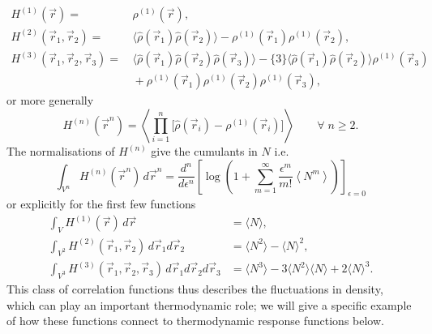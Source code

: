 \begin{subequations}\label{eq:density-density-correlations}
  \begin{align}
    H^{(1)}(\vec{r})
    =& \,
    \rho^{(1)}(\vec{r}),
    \\
    H^{(2)}(\vec{r}_1, \vec{r}_2)
    =& \,
    \big\langle \widehat\rho(\vec{r}_1) \widehat\rho(\vec{r}_2) \big\rangle
    - \rho^{(1)}(\vec{r}_1) \rho^{(1)}(\vec{r}_2),
    \label{eq:pair-density-density-correlation}
    \\
    H^{(3)}(\vec{r}_1, \vec{r}_2, \vec{r}_3)
    =& \,
    \big\langle \widehat\rho(\vec{r}_1) \widehat\rho(\vec{r}_2) \widehat\rho(\vec{r}_3) \big\rangle
    - \{3\} \big\langle \widehat\rho(\vec{r}_1) \widehat\rho(\vec{r}_2) \big\rangle \rho^{(1)}(\vec{r}_3)
    \nonumber \\ & \,
    + \rho^{(1)}(\vec{r}_1) \rho^{(1)}(\vec{r}_2) \rho^{(1)}(\vec{r}_3),
  \end{align}
\end{subequations}
or more generally \cite{Hansen2013}
\begin{equation}\label{eq:density-density-correlations}
  H^{(n)}(\vec{r}^n)
  =
  \left\langle
  \prod_{i=1}^n
  \Big[ \widehat\rho(\vec{r}_i) - \rho^{(1)}(\vec{r}_i) \Big]
  \right\rangle
  \qquad \forall \; n \ge 2.
\end{equation}
The normalisations of $H^{(n)}$ give the cumulants in $N$ i.e.\
\begin{equation*}
  \int_{V^n} H^{(n)}(\vec{r}^n) \, d\vec{r}^n
  =
  \frac{d^n}{d\epsilon^n}
  \left[
  \log{\left(
      1 + \sum_{m=1}^\infty
      \frac{\epsilon^m}{m!} \left\langle N^m \right\rangle
      \right)}
  \right]_{\epsilon = 0}
\end{equation*}
or explicitly for the first few functions
\begin{subequations}
  \begin{align}
    \int_V H^{(1)}(\vec{r}) \, d\vec{r}
    &=
    \langle N \rangle,
    \\
    \int_{V^2} H^{(2)}(\vec{r}_1, \vec{r}_2) \, d\vec{r}_1 d\vec{r}_2
    &=
    \langle N^2 \rangle - \langle N \rangle^2,
    \label{eq:pair-density-density-norm}
    \\
    \int_{V^3} H^{(3)}(\vec{r}_1, \vec{r}_2, \vec{r}_3) \, d\vec{r}_1 d\vec{r}_2 d\vec{r}_3
    &=
    \langle N^3 \rangle
    - 3 \langle N^2 \rangle \langle N \rangle
    + 2 \langle N \rangle^3.
  \end{align}
\end{subequations}
This class of correlation functions thus describes the fluctuations in density, which can play an important thermodynamic role; we will give a specific example of how these functions connect to thermodynamic response functions below.

